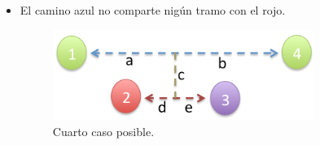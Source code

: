 \begin{itemize}
\begin {itemize}
\begin{itemize}
\begin{figure}[H]
\begin{minipage}[H]{240pt}
\end{minipage}
\hfill
\caption{Tercer caso posible.}
\end{figure}
Supongamos que el algoritmo $BFS$ devuelve el nodo 3 como el más alejado al 2. Entonces, podemos deducir que:
\begin {itemize}
\item $c$ = $d$: \newline Ambas soluciones son correctas.
\item $c > d$: \newline Si este caso ocurriera, $c$ debería formar parte del camino máximo del árbol. Luego, el camino azul no sería el máximo. Por lo tanto, resulta absurdo suponer que el extremo del camino máximo otorgado por $BFS$ no pertencía al camino máximo del árbol. \newline
\end{itemize}
\item El camino azul no comparte nigún tramo con el rojo.
\begin{figure}[H] %
\begin{minipage}[H]{240pt}
\includegraphics[width=240pt]{../imgs/ej2casos03.jpg}
\end{minipage}
\hfill
\caption{Cuarto caso posible.}
\end{figure}
\end{itemize}
\end{itemize}


\end{itemize}
